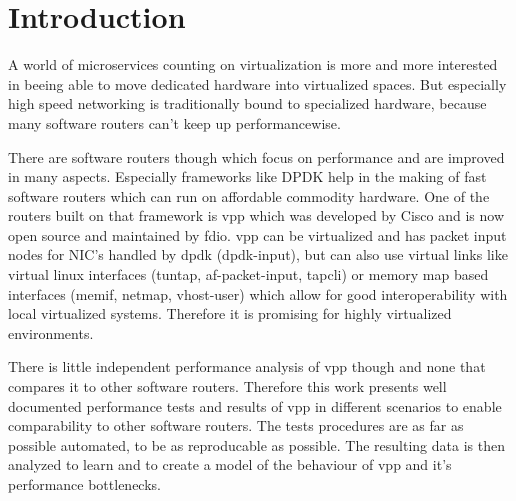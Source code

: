 
\chapter{Introduction}


A world of microservices counting on virtualization is more and
more interested in beeing able to move dedicated hardware into
virtualized spaces. But especially high speed networking is
traditionally bound to specialized hardware, because many software
routers can't keep up performancewise.


There are software routers though which focus on performance and are
improved in many aspects. Especially frameworks like DPDK help in the
making of fast software routers which can run on affordable commodity
hardware. One of the routers built on that framework is \Ac{vpp} which
was developed by Cisco and is now open source and maintained by
\Ac{fdio}. \Ac{vpp} can be virtualized and has packet input nodes for
NIC's handled by \Ac{dpdk} (dpdk-input), but can also use virtual
links like virtual linux interfaces (tuntap, af-packet-input, tapcli)
or memory map based interfaces (memif, netmap, vhost-user) which allow
for good interoperability with local virtualized systems. Therefore it
is promising for highly virtualized environments.




There is little independent performance analysis of \Ac{vpp} though
and none that compares it to other software routers. Therefore this
work presents well documented performance tests and results of
\Ac{vpp} in different scenarios to enable comparability to other
software routers. The tests procedures are as far as possible
automated, to be as reproducable as possible. The resulting data is
then analyzed to learn and to create a model of the behaviour of
\Ac{vpp} and it's performance bottlenecks.

